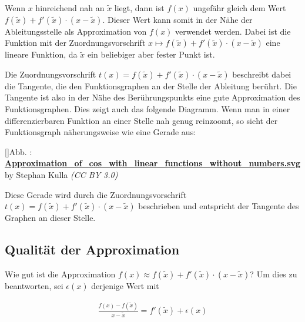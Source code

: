 \documentclass[fontsize=9pt,
               parskip=half-,
               DIV=14,
               listof=chapterentry,
               tocflat]{scrbook}
\newcounter{imagelabel}
\begin{document}
Wenn $x$ hinreichend nah an ${\tilde {x}}$ liegt, dann ist $f(x)$ ungefähr gleich dem Wert $f({\tilde {x}})+f'({\tilde {x}})\cdot (x-{\tilde {x}})$. Dieser Wert kann somit in der Nähe der Ableitungsstelle als Approximation von $f(x)$ verwendet werden. Dabei ist die Funktion mit der Zuordnungsvorschrift $x\mapsto f({\tilde {x}})+f'({\tilde {x}})\cdot (x-{\tilde {x}})$ eine lineare Funktion, da ${\tilde {x}}$ ein beliebiger aber fester Punkt ist.

Die Zuordnungsvorschrift $t(x)=f({\tilde {x}})+f'({\tilde {x}})\cdot (x-{\tilde {x}})$ beschreibt dabei die Tangente, die den Funktionsgraphen an der Stelle der Ableitung berührt. Die Tangente ist also in der Nähe des Berührungspunkts eine gute Approximation des Funktionsgraphen. Dies zeigt auch das folgende Diagramm. Wenn man in einer differenzierbaren Funktion an einer Stelle nah genug reinzoomt, so sieht der Funktionsgraph näherungsweise wie eine Gerade aus:

[]{Abb. : \protect\href{https://commons.wikimedia.org/wiki/File:Approximation_of_cos_with_linear_functions_without_numbers.svg}{\textbf{Approximation\allowbreak\_of\allowbreak\_cos\allowbreak\_with\allowbreak\_linear\allowbreak\_functions\allowbreak\_without\allowbreak\_numbers.svg}} by Stephan Kulla \textit{(CC BY 3.0)}}\begin{center}
\end{center}

Diese Gerade wird durch die Zuordnungsvorschrift $t(x)=f({\tilde {x}})+f'({\tilde {x}})\cdot (x-{\tilde {x}})$ beschrieben und entspricht der Tangente des Graphen an dieser Stelle.

\subsection{Qualität der Approximation}

Wie gut ist die Approximation $f(x)\approx f({\tilde {x}})+f'({\tilde {x}})\cdot (x-{\tilde {x}})$? Um dies zu beantworten, sei $\epsilon (x)$ derjenige Wert mit

\begin{align*}
{\frac {f(x)-f({\tilde {x}})}{x-{\tilde {x}}}}=f'({\tilde {x}})+\epsilon (x)
\end{align*}
\end{document}
